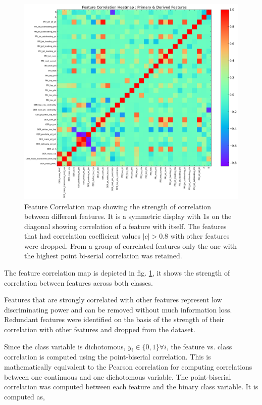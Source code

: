 \documentclass[final,3p,times,twocolumn]{elsarticle}
\begin{document}
\begin{figure}
\hspace{-2cm}
\includegraphics[scale=0.6]{Images/DERFeaturesHeatMap.png}
\caption{Feature Correlation map showing the strength of correlation between different features. It is a symmetric display with 1s on the diagonal showing correlation of a feature with itself. The features that had correlation coefficient values $|c| > 0.8$ with other features were dropped. From a group of correlated features only the one with the highest point bi-serial correlation was retained.}
\label{ff}
\end{figure}

The feature correlation map is depicted in fig. \ref{ff}, it shows the strength of correlation between features across both classes. 

Features that are strongly correlated with other features represent low discriminating power and can be removed without much information loss. Redundant features were identified on the basis of the strength of their correlation with other features and dropped from the dataset. 

Since the class variable is dichotomous, $y_{i} \in \{0,1\} \forall i$, the feature vs. class correlation is computed using the point-biserial correlation. This is mathematically equivalent to the Pearson correlation for computing correlations between one continuous and one dichotomous variable. The point-biserial correlation was computed between each feature and the binary class variable. It is computed as, 
\end{document}
